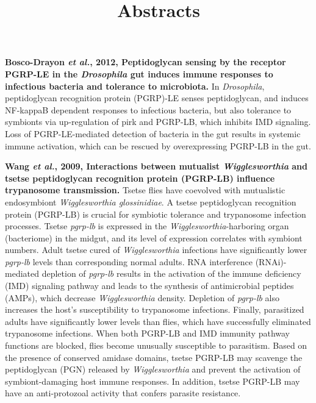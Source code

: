 \documentclass[11pt]{article}
\title{Abstracts}
\author{}
\date{}
\begin{document}
\begin{sloppypar}
  \maketitle

  \linenumbers

\textbf{Bosco-Drayon \textit{et al.}, 2012, Peptidoglycan sensing by the receptor PGRP-LE in the \textit{Drosophila} gut induces immune responses to infectious bacteria and tolerance to microbiota.} \newline
In \textit{Drosophila}, peptidoglycan recognition protein (PGRP)-LE senses peptidoglycan, and induces NF-kappaB dependent responses to infectious bacteria, but also tolerance to symbionts via up-regulation of pirk and PGRP-LB, which inhibits IMD signaling. 
Loss of PGRP-LE-mediated detection of bacteria in the gut results in systemic immune activation, which can be rescued by overexpressing PGRP-LB in the gut.

\par

\textbf{Wang \textit{et al.}, 2009, Interactions between mutualist \textit{Wigglesworthia} and tsetse peptidoglycan recognition protein (PGRP-LB) influence trypanosome transmission.} \newline
Tsetse flies have coevolved with mutualistic endosymbiont \textit{Wigglesworthia glossinidiae}. 
A tsetse peptidoglycan recognition protein (PGRP-LB) is crucial for symbiotic tolerance and trypanosome infection processes. 
Tsetse \textit{pgrp-lb} is expressed in the \textit{Wigglesworthia}-harboring organ (bacteriome) in the midgut, and its level of expression correlates with symbiont numbers. 
Adult tsetse cured of \textit{Wigglesworthia} infections have significantly lower \textit{pgrp-lb} levels than corresponding normal adults. 
RNA interference (RNAi)-mediated depletion of \textit{pgrp-lb} results in the activation of the immune deficiency (IMD) signaling pathway and leads to the synthesis of antimicrobial peptides (AMPs), which decrease \textit{Wigglesworthia} density. 
Depletion of \textit{pgrp-lb} also increases the host's susceptibility to trypanosome infections. 
Finally, parasitized adults have significantly lower  levels than flies, which have successfully eliminated trypanosome infections. 
When both PGRP-LB and IMD immunity pathway functions are blocked, flies become unusually susceptible to parasitism. 
Based on the presence of conserved amidase domains, tsetse PGRP-LB may scavenge the peptidoglycan (PGN) released by \textit{Wigglesworthia} and prevent the activation of symbiont-damaging host immune responses. 
In addition, tsetse PGRP-LB may have an anti-protozoal activity that confers parasite resistance. 


\end{sloppypar}
\end{document}
